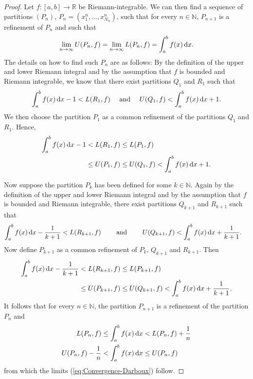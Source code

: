 \begin{proof}
	Let $f:[a,b] \to \mathbb{R}$ be Riemann-integrable. 
	We can then find a sequence of partitions $(P_n)$, $P_n = (x^n_1, \dots, x^n_{N_n})$, such that for every $n \in \mathbb{N}$, $P_{n+1}$ is a refinement of $P_n$ and such that
	\begin{equation}\label{eq:Convergence-Darboux}
	\lim_{n \to \infty} U(P_n, f) = \lim_{n \to \infty} L(P_n, f) = \int_a^b f(x) \,\mathrm{d} x.
	\end{equation}
	The details on how to find such $P_n$ are as follows: By the definition of the upper and lower Riemann integral and by the assumption that $f$ is bounded and Riemann integrable, we know that there exist partitions $Q_1$ and $R_1$ such that
	\[
	\int_a^b f(x) \,\mathrm{d} x - 1 < L(R_1, f) \quad \text{ and } \quad   U(Q_1, f) < \int_a^b f(x) \,\mathrm{d} x + 1 .
	\]
	We then choose the partition $P_1$ as a common refinement of the partitions $Q_1$ and $R_1$. Hence,
	\[
	\begin{split}
	\int_a^b f(x) \,\mathrm{d} x - 1 &< L(R_1, f) 
	\leq L(P_1, f) \\ &\leq U(P_1,f)
	\leq U(Q_1,f) < \int_a^b f(x) \,\mathrm{d} x +1.
	\end{split}
	\]
	
	Now suppose the partition $P_k$ has been defined for some $k \in \mathbb{N}$.
	Again by the definition of the upper and lower Riemann integral and by the assumption that $f$ is bounded and Riemann integrable, there exist partitions $Q_{k+1}$ and $R_{k+1}$ such that
	\[
	\begin{split}
	 \int_a^b f(x) \,\mathrm{d} x - \frac{1}{k+1} &< L(R_{k+1}, f)  \qquad \text{ and } \qquad U(Q_{k+1}, f) < \int_a^b f(x) \,\mathrm{d} x + \frac{1}{k+1}.
	 \end{split}
	\]
	Now define $P_{k+1}$ as a common refinement of $P_k$, $Q_{k+1}$ and $R_{k+1}$. Then
	\[
	\begin{split}
	\int_a^b f(x) \,\mathrm{d} x - \frac{1}{k+1} &< L(R_{k+1}, f) \leq L(P_{k+1}, f) \\
	& \leq U(P_{k+1},f) \leq U(Q_{k+1},f) < \int_a^b f(x) \,\mathrm{d} x + \frac{1}{k+1}.
	\end{split}
	\]
	It follows that for every $n \in \mathbb{N}$, the partition $P_{n+1}$ is a refinement of the partition $P_n$ and 
	\[
	\begin{split}
	L(P_n, f) &\leq \int_a^b f(x) \,\mathrm{d} x < L(P_n, f) + \frac{1}{n} \\
	U(P_n,f)-\frac{1}{n} &< \int_a^b f(x) \,\mathrm{d} x \leq U(P_n,f)
	\end{split}
	\]
	from which the limits (\ref{eq:Convergence-Darboux}) follow.
	

\end{proof}
